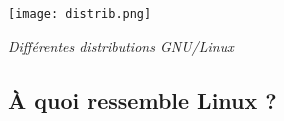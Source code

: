 \begin{rem}
%
%
%
%
%


\begin{center}
\texttt{[image: distrib.png]}

\textit{Différentes distributions GNU/Linux}

\end{center}

\end{rem}




\subsection{À quoi ressemble Linux ?}



